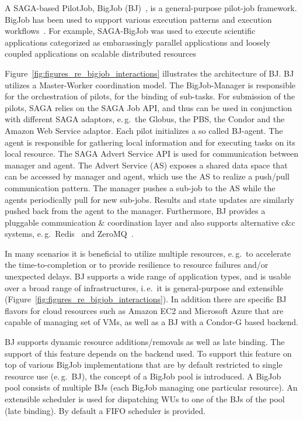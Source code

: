 \documentclass{sig-alternate}
\begin{document}
A SAGA-based PilotJob, BigJob
(BJ)~\cite{bigjob_web,saga_bigjob_condor_cloud}, is a general-purpose
pilot-job framework. BigJob has been used to support various execution
patterns and execution workflows~\cite{async_repex11,saga-royalsoc}.
For example, SAGA-BigJob was used to execute scientific applications
categorized as embarassingly parallel applications and loosely coupled
applications on scalable distributed resources~\cite{ecmls_ccpe10,
  dare-ecmls11}

Figure~\ref{fig:figures_re_bigjob_interactions} illustrates the
architecture of BJ. BJ utilizes a Master-Worker coordination
model. The BigJob-Manager is responsible for the orchestration of
pilots, for the binding of sub-tasks. For submission of the pilots,
SAGA relies on the SAGA Job API, and thus can be used in conjunction
with different SAGA adaptors, e.\,g.\ the Globus, the PBS, the Condor
and the Amazon Web Service adaptor. Each pilot initializes a so called
BJ-agent. The agent is responsible for gathering local information and
for executing tasks on its local resource. The SAGA Advert Service API
is used for communication between manager and agent. The Advert
Service (AS) exposes a shared data space that can be accessed by
manager and agent, which use the AS to realize a push/pull
communication pattern.  The manager pushes a sub-job to the AS while
the agents periodically pull for new sub-jobs. Results and state
updates are similarly pushed back from the agent to the
manager. Furthermore, BJ provides a pluggable communication \&
coordination layer and also supports alternative c\&c systems,
e.\,g.\ Redis~\cite{redis} and ZeroMQ~\cite{zmq}.

In many scenarios it is beneficial to utilize multiple resources,
e.\,g.\ to accelerate the time-to-completion or to provide resilience
to resource failures and/or unexpected delays.  BJ supports a wide
range of application types, and is usable over a broad range of
infrastructures, i.\,e.\ it is general-purpose and extensible
(Figure~\ref{fig:figures_re_bigjob_interactions}). In addition there
are specific BJ flavors for cloud resources such as Amazon EC2 and
Microsoft Azure that are capable of managing set of VMs, as well as a
BJ with a Condor-G based backend.

BJ supports dynamic resource additions/removals as well as late
binding. The support of this feature depends on the backend used. To
support this feature on top of various BigJob implementations that are
by default restricted to single resource use (e.\,g.\ BJ), the concept
of a BigJob pool is introduced. A BigJob pool consists of multiple BJs
(each BigJob managing one particular resource). An extensible
scheduler is used for dispatching WUs to one of the BJs of the pool
(late binding). By default a FIFO scheduler is provided.
\end{document}
